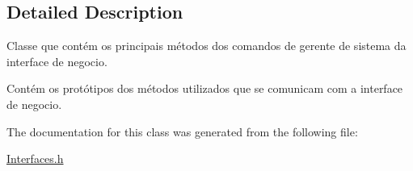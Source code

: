 \subsection{Detailed Description}
Classe que contém os principais métodos dos comandos de gerente de sistema da interface de negocio. 

Contém os protótipos dos métodos utilizados que se comunicam com a interface de negocio. 

The documentation for this class was generated from the following file\+:\begin{DoxyCompactItemize}
\item 
\hyperlink{_interfaces_8h}{Interfaces.\+h}\end{DoxyCompactItemize}
